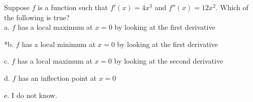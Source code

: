 
Suppose \( f \) is a function such that \( f'(x) = 4x^{3} \) and \( f''(x) = 12x^{2} \). Which of the following is true?\\

a. \( f \) has a local maximum at \( x= 0 \) by looking at the first derivative

*b. \( f \) has a local minimum at \( x= 0 \) by looking at the first derivative

c. \( f \) has a local maximum at \( x= 0 \) by looking at the second derivative

d. \( f \) has an inflection point at \( x= 0 \)

e. I do not know.\\
